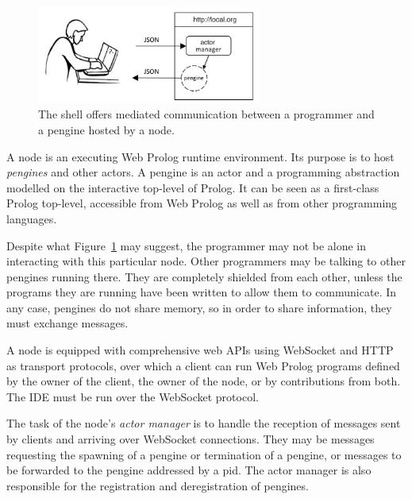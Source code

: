 \documentclass{tlp}
\begin{document}
\begin{figure}[h]
    \centering
	\includegraphics[width=7.3cm]{swish-pengine-interaction}
    \caption{The shell offers mediated communication between a programmer and a pengine hosted by a node.}
    \label{fig:swish-pengine-interaction}
\end{figure}

A node is an executing Web Prolog runtime environment. Its purpose is to host \textit{pengines} and other actors. A pengine is an actor and a programming abstraction modelled on the interactive top-level of Prolog. It can be seen as a first-class Prolog top-level, accessible from Web Prolog as well as from other programming languages. 



\noindent Despite what Figure~\ref{fig:swish-pengine-interaction} may suggest, the programmer may not be alone in interacting with this particular node. Other programmers may be talking to other pengines running there. They are completely shielded from each other, unless the programs they are running have been written to allow them to communicate. In any case, pengines do not share memory, so in order to share information, they must exchange messages.

A node is equipped with comprehensive web APIs using WebSocket and HTTP as transport protocols, over which a client can run Web Prolog programs defined by the owner of the client, the owner of the node, or by contributions from both. The IDE must be run over the WebSocket protocol.

The task of the node's \textit{actor manager} is to handle the reception of messages sent by clients and arriving over WebSocket connections. They may be messages requesting the spawning of a pengine or termination of a pengine, or messages to be forwarded to the pengine addressed by a pid. The actor manager is also responsible for the registration and deregistration of pengines. %
\end{document}
